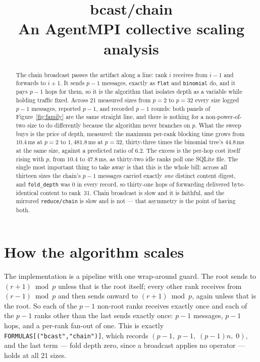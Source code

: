 \documentclass[11pt]{article}
\title{\textbf{bcast/chain}\\[2pt]\large An AgentMPI collective scaling analysis}
\author{}
\date{}
\begin{document}
\maketitle

\begin{abstract}
The chain broadcast passes the artifact along a line: rank $i$ receives from $i-1$ and
forwards to $i+1$. It sends $p-1$ messages, exactly as \texttt{flat} and \texttt{binomial}
do, and it pays $p-1$ hops for them, so it is the algorithm that isolates depth as a variable
while holding traffic fixed. Across 21 measured sizes from $p=2$ to $p=32$ every size logged
$p-1$ messages, reported $p-1$, and recorded $p-1$ rounds: both panels of
Figure~\ref{fig:family} are the same straight line, and there is nothing for a
non-power-of-two size to do differently because the algorithm never branches on $p$. What the
sweep buys is the price of depth, measured: the maximum per-rank blocking time grows from
$10.4$\,ms at $p=2$ to $1{,}481.8$\,ms at $p=32$, thirty-three times the binomial tree's
$44.8$\,ms at the same size, against a predicted ratio of $6.2$. The excess is the per-hop
cost itself rising with $p$, from $10.4$ to $47.8$\,ms, as thirty-two idle ranks poll one
SQLite file. The single most important thing to take away is that this is the whole bill:
across all thirteen sizes the chain's $p-1$ messages carried exactly \emph{one} distinct
content digest, and \texttt{fold\_depth} was $0$ in every record, so thirty-one hops of
forwarding delivered byte-identical content to rank~31. Chain broadcast is slow and it is
faithful, and the mirrored \texttt{reduce/chain} is slow and is not --- that asymmetry is the
point of having both.
\end{abstract}



\section{How the algorithm scales}

The implementation is a pipeline with one wrap-around guard. The root sends to
$(r+1) \bmod p$ unless that is the root itself; every other rank receives from
$(r-1) \bmod p$ and then sends onward to $(r+1) \bmod p$, again unless that is the root. So
each of the $p-1$ non-root ranks receives exactly once and each of the $p-1$ ranks other than
the last sends exactly once: $p-1$ messages, $p-1$ hops, and a per-rank fan-out of one. This
is exactly \texttt{FORMULAS[("bcast","chain")]}, which records
$(p-1,\;p-1,\;(p-1)n,\;0)$, and the last term --- fold depth zero, since a broadcast applies
no operator --- holds at all 21 sizes.
\end{document}
